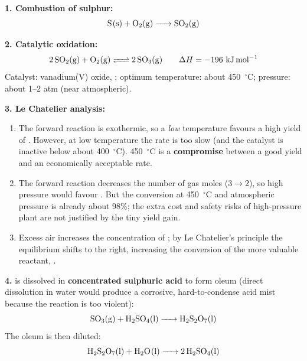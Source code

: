 \documentclass[11pt]{article}
\begin{document}
\begin{corrige}
\textbf{1. Combustion of sulphur:}
\[ \ce{S(s) + O2(g) -> SO2(g)} \]

\textbf{2. Catalytic oxidation:}
\[ \ce{2SO2(g) + O2(g) <=> 2SO3(g)} \qquad \Delta H = -196\ \mathrm{kJ\,mol^{-1}} \]
Catalyst: vanadium(V) oxide, ; optimum temperature: about \SI{450}{\ensuremath{{}^{\circ}\mathrm{C}}}; pressure: about 1--2 atm (near atmospheric).

\textbf{3. Le Chatelier analysis:}
\begin{enumerate}
\item[(a)] The forward reaction is exothermic, so a \emph{low} temperature favours a high yield of . However, at low temperature the rate is too slow (and the catalyst is inactive below about \SI{400}{\ensuremath{{}^{\circ}\mathrm{C}}}). \SI{450}{\ensuremath{{}^{\circ}\mathrm{C}}} is a \textbf{compromise} between a good yield and an economically acceptable rate.
\item[(b)] The forward reaction decreases the number of gas moles ($3 \rightarrow 2$), so high pressure would favour . But the conversion at \SI{450}{\ensuremath{{}^{\circ}\mathrm{C}}} and atmospheric pressure is already about 98\%; the extra cost and safety risks of high-pressure plant are not justified by the tiny yield gain.
\item[(c)] Excess air increases the concentration of ; by Le Chatelier's principle the equilibrium shifts to the right, increasing the conversion of the more valuable reactant, .
\end{enumerate}

\textbf{4.}  is dissolved in \textbf{concentrated sulphuric acid} to form oleum (direct dissolution in water would produce a corrosive, hard-to-condense acid mist because the reaction is too violent):
\[ \ce{SO3(g) + H2SO4(l) -> H2S2O7(l)} \]
The oleum is then diluted:
\[ \ce{H2S2O7(l) + H2O(l) -> 2H2SO4(l)} \]
\end{corrige}
\end{document}
